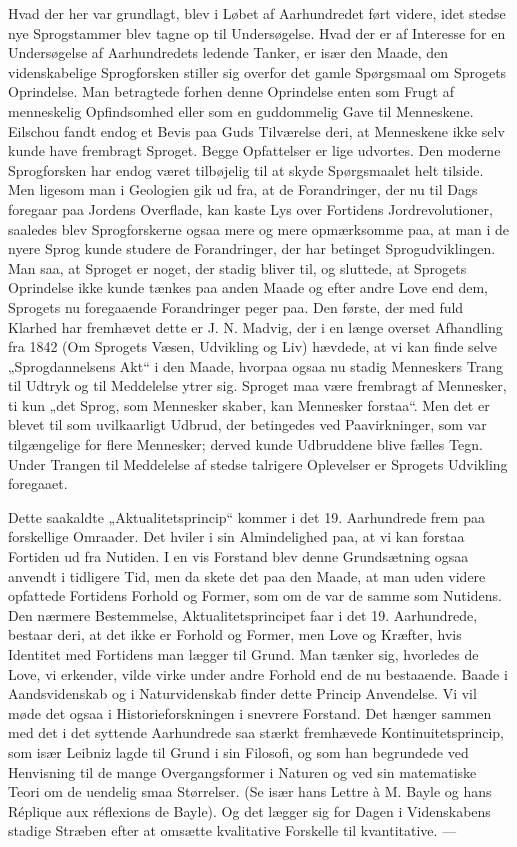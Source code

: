 \documentclass[12pt,a4paper,openany]{book}
\newcommand{\opage}[1]{\marginnote{\footnotesize\textit{[#1]}}}
\begin{document}
Hvad der her var grundlagt, blev i Løbet af Aarhundredet ført
videre, idet stedse nye Sprogstammer blev tagne op til Undersøgelse.
Hvad der er af Interesse for en Undersøgelse af Aarhundredets ledende
Tanker, er især den Maade, den videnskabelige Sprogforsken
stiller sig overfor det gamle Spørgsmaal om Sprogets Oprindelse.
Man betragtede forhen denne Oprindelse enten som Frugt af menneskelig
Opfindsomhed eller som en guddommelig Gave til Menneskene.
Eilschou fandt endog et Bevis paa Guds Tilværelse deri, at
Menneskene ikke selv kunde have frembragt Sproget. Begge Opfattelser
er lige udvortes. Den moderne Sprogforsken har endog været
tilbøjelig til at skyde Spørgsmaalet helt tilside. Men ligesom man i
Geologien gik ud fra, at de Forandringer, der nu til Dags foregaar
paa Jordens Overflade, kan kaste Lys over Fortidens Jordrevolutioner,
saaledes blev Sprogforskerne ogsaa mere og mere opmærksomme
paa, at man i de nyere Sprog kunde studere de Forandringer,
der har betinget Sprogudviklingen. Man saa, at Sproget er noget, der
stadig bliver til, og sluttede, at Sprogets Oprindelse ikke kunde tænkes
paa anden Maade og efter andre Love end dem, Sprogets nu
foregaaende Forandringer peger paa. Den første, der med fuld Klarhed
har fremhævet dette er J. N. Madvig, der i en længe overset Afhandling
fra 1842 (Om Sprogets Væsen, Udvikling og Liv) hævdede,
at vi kan finde selve „Sprogdannelsens Akt“ i den Maade, hvorpaa
ogsaa nu stadig Menneskers Trang til Udtryk og til Meddelelse ytrer
sig. Sproget maa være frembragt af Mennesker, ti kun „det Sprog,
som Mennesker skaber, kan Mennesker forstaa“. Men det er blevet
til som uvilkaarligt Udbrud, der betingedes ved Paavirkninger, som
\opage{55}var tilgængelige for flere Mennesker; derved kunde Udbruddene blive
fælles Tegn. Under Trangen til Meddelelse af stedse talrigere Oplevelser
er Sprogets Udvikling foregaaet.

Dette saakaldte „Aktualitetsprincip“ kommer i det 19. Aarhundrede
frem paa forskellige Omraader. Det hviler i sin Almindelighed
paa, at vi kan forstaa Fortiden ud fra Nutiden. I en vis Forstand
blev denne Grundsætning ogsaa anvendt i tidligere Tid, men da skete
det paa den Maade, at man uden videre opfattede Fortidens Forhold
og Former, som om de var de samme som Nutidens. Den nærmere
Bestemmelse, Aktualitetsprincipet faar i det 19. Aarhundrede, bestaar
deri, at det ikke er Forhold og Former, men Love og Kræfter,
hvis Identitet med Fortidens man lægger til Grund. Man tænker sig,
hvorledes de Love, vi erkender, vilde virke under andre Forhold end
de nu bestaaende. Baade i Aandsvidenskab og i Naturvidenskab
finder dette Princip Anvendelse. Vi vil møde det ogsaa i Historieforskningen
i snevrere Forstand. Det hænger sammen med det i det
syttende Aarhundrede saa stærkt fremhævede Kontinuitetsprincip,
som især Leibniz lagde til Grund i sin Filosofi, og som han begrundede
ved Henvisning til de mange Overgangsformer i Naturen og
ved sin matematiske Teori om de uendelig smaa Størrelser. (Se især
hans Lettre à M. Bayle og hans Réplique aux réflexions de Bayle).
Og det lægger sig for Dagen i Videnskabens stadige Stræben efter
at omsætte kvalitative Forskelle til kvantitative. ---
\end{document}
